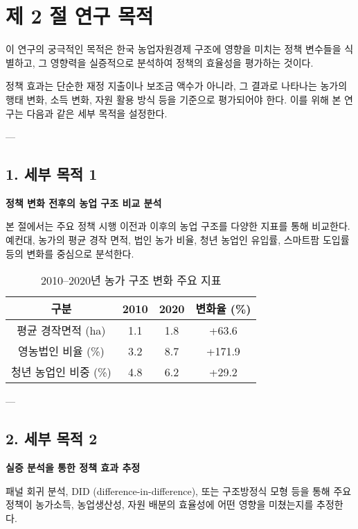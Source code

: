 \section*{제 2 절 연구 목적}\label{sec:chapter1_2}

이 연구의 궁극적인 목적은 한국 농업자원경제 구조에 영향을 미치는 정책 변수들을 식별하고,  
그 영향력을 실증적으로 분석하여 정책의 효율성을 평가하는 것이다.  

정책 효과는 단순한 재정 지출이나 보조금 액수가 아니라,  
그 결과로 나타나는 농가의 행태 변화, 소득 변화, 자원 활용 방식 등을 기준으로 평가되어야 한다.  
이를 위해 본 연구는 다음과 같은 세부 목적을 설정한다.

---

\subsection*{1. 세부 목적 1}\label{subsec:chapter1_2_1}

\textbf{정책 변화 전후의 농업 구조 비교 분석}  

본 절에서는 주요 정책 시행 이전과 이후의 농업 구조를 다양한 지표를 통해 비교한다.  
예컨대, 농가의 평균 경작 면적, 법인 농가 비율, 청년 농업인 유입률, 스마트팜 도입률 등의 변화를 중심으로 분석한다.

\begin{table}[htbp]
  \centering
  \begin{tabular}{|c|c|c|c|}
    \hline
    구분 & 2010 & 2020 & 변화율 (\%) \\
    \hline
    평균 경작면적 (ha) & 1.1 & 1.8 & +63.6 \\
    영농법인 비율 (\%) & 3.2 & 8.7 & +171.9 \\
    청년 농업인 비중 (\%) & 4.8 & 6.2 & +29.2 \\
    \hline
  \end{tabular}
  \caption{2010–2020년 농가 구조 변화 주요 지표}\label{tab:chapter1_2}
\end{table}

---

\subsection*{2. 세부 목적 2}\label{subsec:chapter1_2_2}

\textbf{실증 분석을 통한 정책 효과 추정}  

패널 회귀 분석, DID (difference-in-difference), 또는 구조방정식 모형 등을 통해  
주요 정책이 농가소득, 농업생산성, 자원 배분의 효율성에 어떤 영향을 미쳤는지를 추정한다.  

